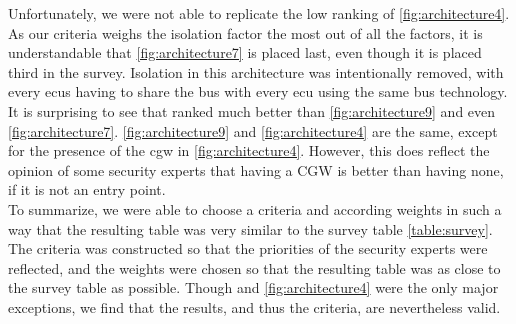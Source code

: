 Unfortunately, we were not able to replicate the low ranking of \ref{fig:architecture4}.
As our criteria weighs the isolation factor the most out of all the factors, it is understandable that \ref{fig:architecture7} is placed last,
even though it is placed third in the survey.
Isolation in this architecture was intentionally removed, with every \acrshort{ecu}s having to share the bus with every \acrshort{ecu} using the same bus technology.
It is surprising to see that  ranked much better than \ref{fig:architecture9} and even \ref{fig:architecture7}.
\ref{fig:architecture9} and \ref{fig:architecture4} are the same, except for the presence of the \acrshort{cgw} in \ref{fig:architecture4}.
However, this does reflect the opinion of some security experts that having a CGW is better than having none, if it is not an entry point.\\

To summarize, we were able to choose a criteria and according weights in such a way that the resulting table was very similar to the survey table \ref{table:survey}.
The criteria was constructed so that the priorities of the security experts were reflected, 
and the weights were chosen so that the resulting table was as close to the survey table as possible.
Though  and \ref{fig:architecture4} were the only major exceptions, 
we find that the results, and thus the criteria, are nevertheless valid.\\